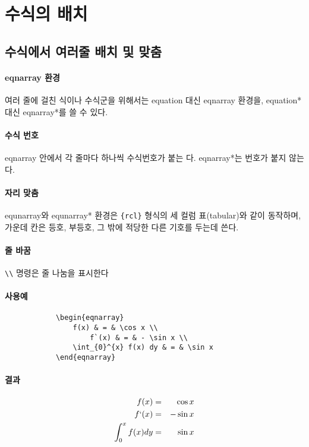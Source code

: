 \documentclass[12pt,a4paper]{report}
\begin{document}
	
%
%
%
\clearpage
\section{수식의 배치}


	\subsection{수식에서 여러줄 배치 및 맞춤}
		\paragraph{eqnarray 환경}
		여러 줄에 걸친 식이나 수식군을 위해서는 equation  대신 eqnarray 환경을, equation* 대신 eqnarray*를 쓸 수 있다.
		
		\paragraph{수식 번호}
		eqnarray 안에서 각 줄마다 하나씩 수식번호가 붙는 다. eqnarray*는 번호가 붙지 않는다.
		
		\paragraph{자리 맞춤}
		equnarray와 equnarray* 환경은 \verb|{rcl}| 형식의 세 컬럼 표(tabular)와 같이 동작하며,
		가운데 칸은 등호, 부등호, 그 밖에 적당한 다른 기호를 두는데 쓴다.

		\paragraph{줄 바꿈}
		\verb|\\| 명령은 줄 나눔을 표시한다

		\clearpage
		\paragraph{사용예}
		\begin{verbatim}
			\begin{eqnarray}
			    f(x) & = & \cos x \\
    			    f`(x) & = & - \sin x \\
			    \int_{0}^{x} f(x) dy & = & \sin x 
			\end{eqnarray}
		\end{verbatim}
		\paragraph{결과}
		\begin{eqnarray}
			f(x) & = & \cos x \\
			f`(x) & = & - \sin x \\
			\int_{0}^{x} f(x) dy & = & \sin x 
		\end{eqnarray}
		
\end{document}
